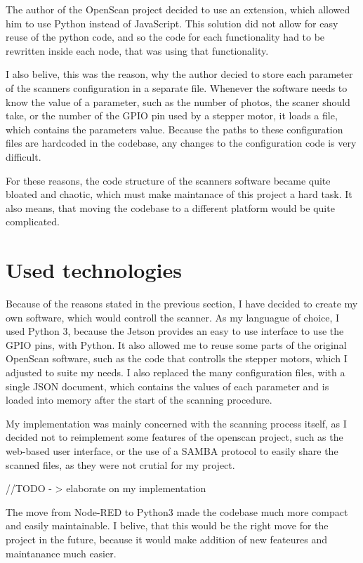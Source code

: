 The author of the OpenScan project decided to use an extension, which allowed him to use Python instead of JavaScript.
This solution did not allow for easy reuse of the python code, and so the code for each functionality had to be rewritten inside each node, that was using that functionality.

I also belive, this was the reason, why the author decied to store each parameter of the scanners configuration in a separate file.
Whenever the software needs to know the value of a parameter, such as the number of photos, the scaner should take, or the number of the GPIO pin used by a stepper motor, it loads a file, which contains the parameters value.
Because the paths to these configuration files are hardcoded in the codebase, any changes to the configuration code is very difficult.

For these reasons, the code structure of the scanners software became quite bloated and chaotic, which must make maintanace of this project a hard task.
It also means, that moving the codebase to a different platform would be quite complicated.


\section{Used technologies}
Because of the reasons stated in the previous section, I have decided to create my own software, which would controll the scanner.
As my languague of choice, I used Python 3, because the Jetson provides an easy to use interface to use the GPIO pins, with Python.
It also allowed me to reuse some parts of the original OpenScan software, such as the code that controlls the stepper motors, which I adjusted to suite my needs.
I also replaced the many configuration files, with a single JSON document, which contains the values of each parameter and is loaded into memory after the start of the scanning procedure.

My implementation was mainly concerned with the scanning process itself, as I decided not to reimplement some features of the openscan project, such as the web-based user interface, or the use of a SAMBA protocol to easily share the scanned files, as they were not crutial for my project.

//TODO - > elaborate on my implementation


The move from Node-RED to Python3 made the codebase much more compact and easily maintainable.
I belive, that this would be the right move for the project in the future, because it would make addition of new feateures and maintanance much easier.






\endinput